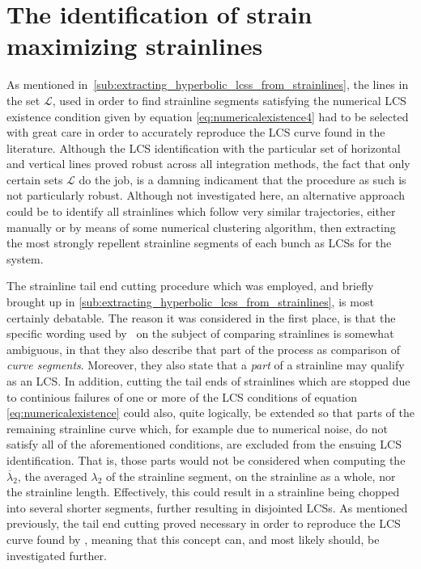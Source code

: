 \section{The identification of strain maximizing strainlines}
\label{sec:the_identification_of_strain_maximizing_strainlines}

As mentioned in~\cref{sub:extracting_hyperbolic_lcss_from_strainlines},
the lines in the set $\mathcal{L}$, used in order to find strainline segments
satisfying the numerical LCS existence condition given by equation
\eqref{eq:numericalexistence4} had to be selected with great care in order
to accurately reproduce the LCS curve found in the literature. Although
the LCS identification with the particular set of horizontal and vertical lines
proved robust across all integration methods, the fact that only certain sets
$\mathcal{L}$ do the job, is a damning indicament that the procedure as such
is not particularly robust. Although not investigated here, an alternative
approach could be to identify all strainlines which follow very similar
trajectories, either manually or by means of some numerical clustering
algorithm, then extracting the most strongly repellent strainline segments
of each bunch as LCSs for the system.

The strainline tail end cutting procedure which was employed, and
briefly brought up in
\cref{sub:extracting_hyperbolic_lcss_from_strainlines}, is most certainly
debatable. The reason it was considered in the first place, is that the specific
wording used by~\textcite{farazmand2012computing} on the subject of comparing
strainlines is somewhat ambiguous, in that they also describe that part of
the process as comparison of \emph{curve segments}. Moreover, they also state
that a \emph{part} of a strainline may qualify as an LCS. In addition,
cutting the tail ends of strainlines which are stopped due to continious
failures of one or more of the LCS conditions of equation
\eqref{eq:numericalexistence} could also, quite logically, be extended so that
parts of the remaining strainline curve which, for example due to numerical
noise, do not satisfy all of the aforementioned conditions, are excluded from
the ensuing LCS identification. That is, those parts would not be considered
when computing the $\overline{\lambda}_{2}$, the averaged $\lambda_{2}$ of
the strainline segment, on the strainline as a whole, nor
the strainline length. Effectively, this could result in a strainline being
chopped into several shorter segments, further resulting in
disjointed LCSs. As mentioned previously, the tail end cutting proved necessary
in order to reproduce the LCS curve found by \textcite{farazmand2012computing},
meaning that this concept can, and most likely should, be investigated further.

